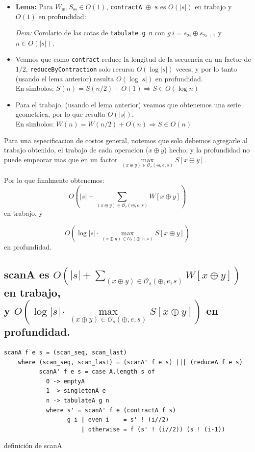 \documentclass[12pt]{article}
\begin{document}
\begin{itemize}
\item \textbf{Lema:} Para $W_\oplus,S_\oplus \in O(1)$, \texttt{contractA $\oplus$ s} es $O(|s|)$ en trabajo y $O(1)$ en profundidad:

 \textit{Dem:} Corolario de las cotas de \texttt{tabulate g n} con $g\ i = s_{2i}\oplus s_{2i+1}$ y $n\in O(|s|)$.
\end{itemize}
\begin{itemize}
\item Veamos que como \texttt{contract} reduce la longitud de la secuencia en un factor de $1/2$, \texttt{reduceByContraction} solo recursa $O(\log |s|)$ veces, y por lo tanto (usando el lema anterior) resulta $O(\log |s|)$ en profundidad.\\
En simbolos: $S(n) = S(n/2) + O(1) \Rightarrow S \in O(\log n)$

\item Para el trabajo, (usando el lema anterior) veamos que obtenemos una serie geometrica, por lo que resulta $O(|s|)$.\\
En simbolos: $W(n) = W(n/2) + O(n) \Rightarrow S \in O(n)$
\end{itemize}
Para una especificacion de costos general, notemos que solo debemos agregarle al trabajo obtenido, el trabajo de cada operacion ($x\oplus y$) hecho, y la profundidad no puede empeorar mas que en un factor $\max\limits_{(x\oplus y)\in\mathcal{O}_r(\oplus,e,s)} S[x\oplus y]$.

Por lo que finalmente obtenemos:
$$O(|s| + \sum\limits_{(x\oplus y)\in\mathcal{O}_r(\oplus,e,s)} W[x\oplus y])$$ en trabajo, y

$$ O(\log |s|\cdot \max\limits_{(x\oplus y)\in\mathcal{O}_r(\oplus,e,s)} S[x\oplus y])$$ en profundidad.

\subsection{scanA es $O(|s| + \sum\limits_{(x\oplus y)\in\mathcal{O}_s(\oplus,e,s)} W[x\oplus y])$ en trabajo,\\
y $ O(\log |s|\cdot \max\limits_{(x\oplus y)\in\mathcal{O}_s(\oplus,e,s)} S[x\oplus y])$ en profundidad.}



\begin{table}[h]
\begin{lstlisting}
scanA f e s = (scan_seq, scan_last)
    where (scan_seq, scan_last) = (scanA' f e s) ||| (reduceA f e s)
          scanA' f e s = case A.length s of
            0 -> emptyA
            1 -> singletonA e
            n -> tabulateA g n
            where s' = scanA' f e (contractA f s)
                  g i | even i    = s' ! (i//2)
                      | otherwise = f (s' ! (i//2)) (s ! (i-1))
\end{lstlisting}
\caption{definición de scanA}
\end{table}
\end{document}
